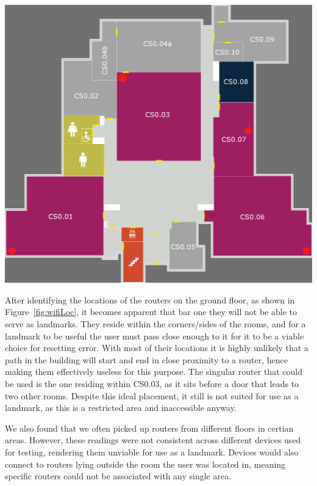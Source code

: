\documentclass[12pt,a4paper]{report}
\begin{document}
\begin{center}
\includegraphics[scale=0.3]{images-implementation/wifiLocation.png}
\label{fig:wifiLoc}
\end{center}

After identifying the locations of the routers on the ground floor, as shown in Figure~\ref{fig:wifiLoc}, it becomes apparent that bar one they will not be able to serve as landmarks. They reside within the corners/sides of the rooms, and for a landmark to be useful the user must pass close enough to it for it to be a viable choice for resetting error. With most of their locations it is highly unlikely that a path in the building will start and end in close proximity to a router, hence making them effectively useless for this purpose. The singular router that could be used is the one residing within CS0.03, as it sits before a door that leads to two other rooms. Despite this ideal placement, it still is not suited for use as a landmark, as this is a restricted area and inaccessible anyway.

We also found that we often picked up routers from different floors in certian areas. However, these readings were not consistent across different devices used for testing, rendering them unviable for use as a landmark. Devices would also connect to routers lying outside the room the user was located in, meaning specific routers could not be associated with any single area.
\end{document}
